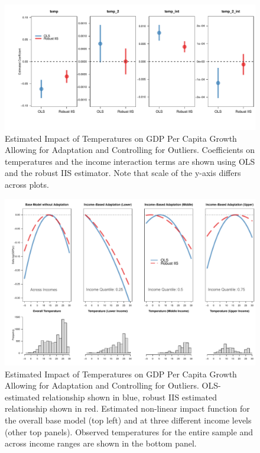 \documentclass[11pt, letterpaper]{article}
\numberwithin{algorithm}{section}
\numberwithin{assumption}{section}
\numberwithin{lemma}{section}
\numberwithin{theorem}{section}
\numberwithin{corollary}{section}
\numberwithin{remark}{section}
\numberwithin{equation}{section}
\numberwithin{figure}{section}
\numberwithin{table}{section}
\begin{document}
\begin{figure}[!htbp]  %
\centering
\includegraphics[width = \textwidth]{coef.adapt.pdf}
\caption{Estimated Impact of Temperatures on GDP Per Capita Growth Allowing for Adaptation and Controlling for Outliers. Coefficients on temperatures and the income interaction terms are shown using OLS and the robust IIS estimator. Note that scale of the y-axis differs across plots.}
\label{fig_dist_coef_app1}
\end{figure}

\begin{figure}[!htbp]  \vspace{-.35in}
\centering
\includegraphics[width = \textwidth]{eff.adapt.v2.pdf}
\caption{Estimated Impact of Temperatures on GDP Per Capita Growth Allowing for Adaptation and Controlling for Outliers. OLS-estimated relationship shown in blue, robust IIS estimated relationship shown in red. Estimated non-linear impact function for the overall base model (top left) and at three different income levels (other top panels). Observed temperatures for the entire sample and across income ranges are shown in the bottom panel. }
\label{fig_dist_app1}
\end{figure}
\end{document}
